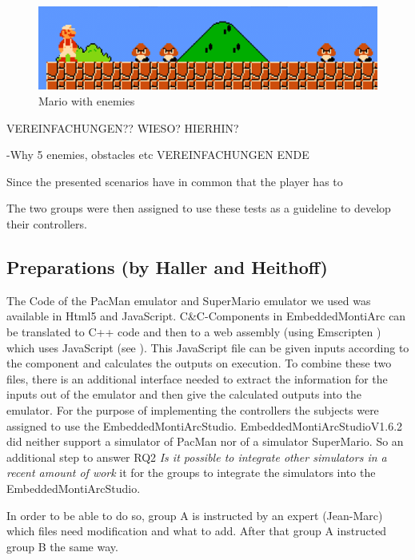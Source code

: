 \begin{figure}[!h]
	\centering
	\includegraphics[scale=0.55]{pictures/Mario4.PNG}
	\caption{Mario with enemies}
	\label{fig:marioFight}
\end{figure}


VEREINFACHUNGEN?? WIESO? HIERHIN?

-Why 5 enemies, obstacles etc
VEREINFACHUNGEN ENDE

Since the presented scenarios have in common that the player has to 

The two groups were then assigned to use these tests as a guideline to develop their controllers.


\subsection{Preparations (by Haller and Heithoff)}
The Code of the PacMan emulator \cite{pacmanLink} and SuperMario emulator \cite{marioLink} we used was available in Html5 and JavaScript. C\&C-Components in EmbeddedMontiArc can be translated to C++ code and then to a web assembly (using Emscripten \cite{emscirpten}) which uses JavaScript (see \cite{bertram2017component}). This JavaScript file can be given inputs according to the component and calculates the outputs on execution. To combine these two files, there is an additional interface needed to extract the information for the inputs out of the emulator and then give the calculated outputs into the emulator.
For the purpose of implementing the controllers the subjects were assigned to use the EmbeddedMontiArcStudio.
EmbeddedMontiArcStudioV1.6.2 did neither support a simulator of PacMan nor of a simulator SuperMario. So an additional step to answer RQ2 \textit{Is it possible to integrate other simulators in a recent amount of work} it for the groups to integrate the simulators into the EmbeddedMontiArcStudio.

In order to be able to do so, group A is instructed by an expert (Jean-Marc) which files need modification and what to add. After that group A instructed group B the same way.

